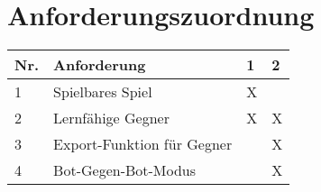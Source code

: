 \section{Anforderungszuordnung}
\begin{tabularx}{\textwidth}{|p{0.7cm}|p{7.0cm}|X|X|}
\hline
Nr. & Anforderung & 1 & 2 \\
\hline
1 & Spielbares Spiel & X & \\
\hline
2 & Lernfähige Gegner & X & X  \\
\hline
3 & Export-Funktion für Gegner & & X  \\
\hline
4 & Bot-Gegen-Bot-Modus & & X    \\
\hline
\end{tabularx}
